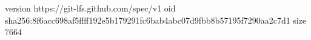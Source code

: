 version https://git-lfs.github.com/spec/v1
oid sha256:8f6acc698af5ffff192e5b179291fc6bab4abc07d9fbb8b57195f7290aa2c7d1
size 7664
